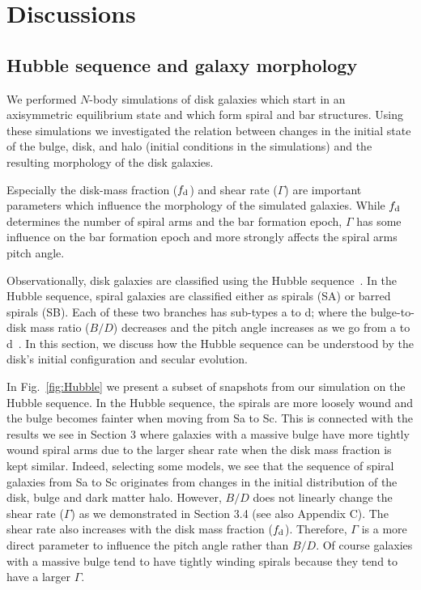 
\section{Discussions}

\subsection{Hubble sequence and galaxy morphology}\label{Sect:Hubble}

We performed $N$-body simulations of disk galaxies
which start in an axisymmetric equilibrium state and which form spiral and 
bar structures. 
Using these simulations we investigated the relation between changes 
in the initial state of the bulge, disk, and halo (initial conditions in the simulations)
and the resulting morphology of the disk galaxies.

Especially the disk-mass fraction ($f_{\rm d}$) and shear rate ($\Gamma$)
are important parameters which influence the morphology of the simulated galaxies.
While $f_{\rm d}$ determines the number of spiral arms and
the bar formation epoch, $\Gamma$ has some influence on the bar formation
epoch and more strongly affects the spiral arms pitch angle.

Observationally, disk galaxies are classified using the
Hubble sequence~\citep{1926ApJ....64..321H}. In the Hubble sequence,
spiral galaxies are classified either as spirals (SA) or barred spirals (SB).
Each of these two branches has sub-types a to d; where the bulge-to-disk 
mass ratio ($B/D$) decreases and the pitch angle increases as we go from a to d~\citep{1961hag..book.....S}. 
In this section,
we discuss how the Hubble sequence can be understood by the disk's initial configuration
and secular evolution.



In Fig.~\ref{fig:Hubble} we present a subset of 
snapshots from our simulation on the Hubble sequence.
In the Hubble sequence, the spirals are more loosely wound and the bulge becomes
fainter when moving from Sa to Sc. This is connected with the results we see in Section 3 where 
galaxies with a massive bulge have more tightly wound spiral arms due to the larger 
shear rate when the disk mass fraction is kept similar. Indeed, selecting
some models, we see that the sequence of spiral galaxies from Sa to Sc 
originates from changes in the initial distribution of the disk, bulge
and dark matter halo. 
However, $B/D$ does not linearly change the shear rate ($\Gamma$) as we
demonstrated in Section 3.4 (see also Appendix C). The shear rate also increases with
the disk mass fraction ($f_{\rm d}$). 
Therefore, $\Gamma$ is a more direct parameter to influence the pitch angle rather than $B/D$.
Of course galaxies with a massive bulge tend to have tightly winding spirals
because they tend to have a larger $\Gamma$.




